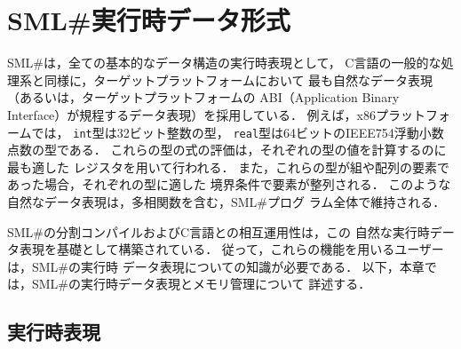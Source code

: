 \documentclass{jbook}
\newif\ifjp
\newcommand{\txt}[2]{#1}
\newcommand{\smlsharp}{SML\#}
\begin{document}
\else%
\fi%

% 
\ifjp%
\else%
\fi%





% 
\chapter{\txt{\smlsharp{}実行時データ形式}{\smlsharp{} Run-time Data Format}}
\label{chap:runtimeDataFormat}
\ifjp%
\else%
\fi%

	\smlsharp{}は，全ての基本的なデータ構造の実行時表現として，
C言語の一般的な処理系と同様に，ターゲットプラットフォームにおいて
最も自然なデータ表現（あるいは，ターゲットプラットフォームの
ABI（Application Binary Interface）が規程するデータ表現）を採用している．
	例えば，x86プラットフォームでは，
{\tt int}型は32ビット整数の型，
{\tt real}型は64ビットのIEEE754浮動小数点数の型である．
	これらの型の式の評価は，それぞれの型の値を計算するのに最も適した
レジスタを用いて行われる．
	また，これらの型が組や配列の要素であった場合，それぞれの型に適した
境界条件で要素が整列される．
	このような自然なデータ表現は，多相関数を含む，\smlsharp{}プログ
ラム全体で維持される．

	\smlsharp{}の分割コンパイルおよびC言語との相互運用性は，この
自然な実行時データ表現を基礎として構築されている．
	従って，これらの機能を用いるユーザーは，\smlsharp{}の実行時
データ表現についての知識が必要である．
	以下，本章では，\smlsharp{}の実行時データ表現とメモリ管理について
詳述する．

\section{実行時表現}
\end{document}
